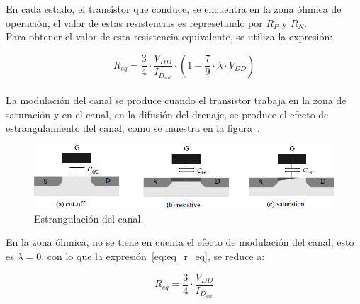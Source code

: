 En cada estado, el transistor que conduce, se encuentra en la zona óhmica de operación, el valor de estas resistencias es represetando por $R_{P}$ y $R_{N}$. \\



Para obtener el valor de esta resistencia equivalente, se utiliza la expresión:


\begin{equation}
R_{eq} = \frac{3}{4} \cdot \frac{V_{DD}}{I_{D_{sat}}} \cdot \left( 1 - \frac{7}{9} \cdot \lambda \cdot V_{DD} \right)
\label{eq:eq_r_eq}
\end{equation} \\



La modulación del canal se produce cuando el transistor trabaja en la zona de saturación y en el canal, en la difusión del drenaje, se produce el efecto de  estrangulamiento del canal, como se muestra en la figura~.



\begin{figure}[H] %
\begin{center}
\includegraphics[width=0.7 \textwidth, angle=0]{./img/point1/channel_strangulation}
\caption{\label{fig:fig_channel_strangulation}\footnotesize{Estrangulación del canal.}}
\end{center}
\end{figure}


En la zona óhmica, no se tiene en cuenta el efecto de modulación del canal, esto es $\lambda = 0$, con lo que la expresión~\eqref{eq:eq_r_eq}, se reduce a:


\begin{equation}
R_{eq} = \frac{3}{4} \cdot \frac{V_{DD}}{I_{D_{sat}}}
\label{eq:eq_r_eq_red}
\end{equation} \\















